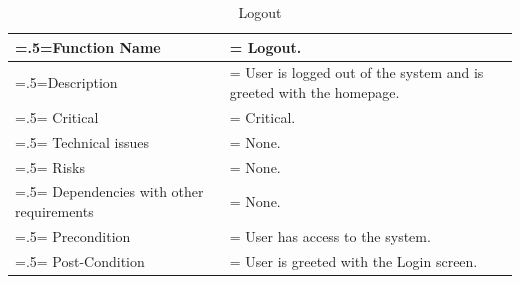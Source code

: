 \begin{center}
    \begin{table}[H]
        \caption{Logout}
        \begin{tabularx}{\textwidth} {
                | >{\raggedright\arraybackslash\hsize=.5\hsize\linewidth=\hsize}X
                | >{\raggedright\arraybackslash\hsize=1.5\hsize\linewidth=\hsize}X |}
            \hline
            Function Name                        & Logout.                                                            \\ \hline
            Description                          & User is logged out of the system and is greeted with the homepage. \\ \hline
            Critical                             & Critical.                                                          \\ \hline
            Technical issues                     & None.                                                              \\ \hline
            Risks                                & None.                                                              \\ \hline
            Dependencies with other requirements & None.                                                              \\ \hline
            Precondition                         & User has access to the system.                                     \\ \hline
            Post-Condition                       & User is greeted with the Login screen.                             \\ \hline
        \end{tabularx}
    \end{table}
\end{center}

